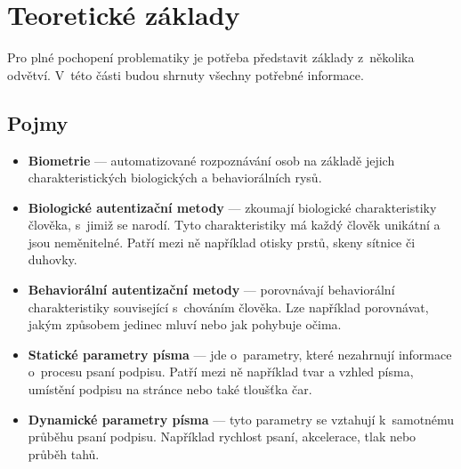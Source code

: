 
\chapter{Teoretické základy}
Pro plné pochopení problematiky je potřeba představit základy z~několika odvětví. 
V~této části budou shrnuty všechny potřebné informace. 

\section{Pojmy}\label{sec:pojmy}
\begin{itemize}
  \item \textbf{Biometrie} --- automatizované rozpoznávání osob na základě jejich charakteristických biologických a behaviorálních rysů. %
  \item \textbf{Biologické autentizační metody} --- zkoumají biologické charakteristiky člověka, s~jimiž se narodí. Tyto charakteristiky má každý člověk unikátní a jsou neměnitelné. Patří mezi ně například otisky prstů, skeny sítnice či duhovky.  
  \item \textbf{Behaviorální autentizační metody} --- porovnávají behaviorální charakteristiky související s~chováním člověka. Lze například porovnávat, jakým způsobem jedinec mluví nebo jak pohybuje očima.
  \item \textbf{Statické parametry písma} --- jde o~parametry, které nezahrnují informace o~procesu psaní podpisu. Patří mezi ně například tvar a vzhled písma, umístění podpisu na stránce nebo také tloušťka čar.
  \item \textbf{Dynamické parametry písma} --- tyto parametry se vztahují k~samotnému průběhu psaní podpisu. Například rychlost psaní, akcelerace, tlak nebo průběh tahů.
\end{itemize}

